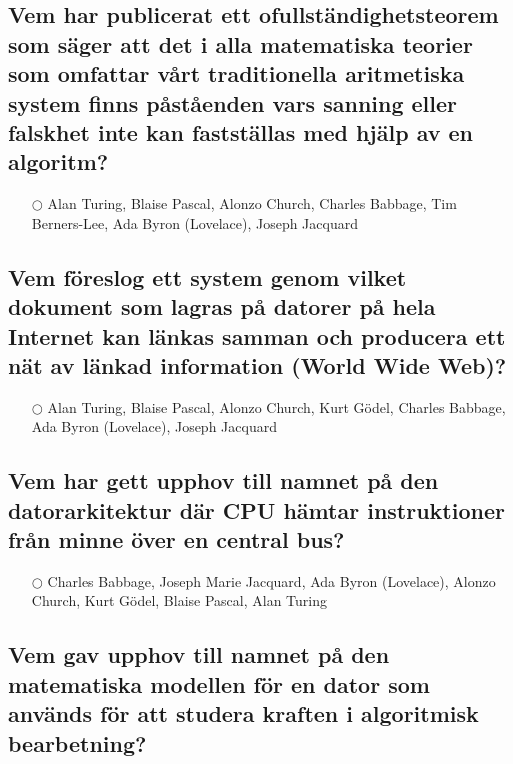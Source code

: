 \documentclass[a4paper,11pt,oneside]{article}
\begin{document}
\begin{sloppypar}
\subsection{Vem har publicerat ett ofullst\"andighetsteorem som s\"ager att det i alla matematiska teorier som omfattar v\r{a}rt traditionella aritmetiska system finns p\r{a}st\r{a}enden vars sanning eller falskhet inte kan fastst\"allas med hj\"alp av en algoritm?}

\label{q:438:mc:sv:True}

\begin{itemize}
  \item[$\bigcirc$] Alan Turing, Blaise Pascal, Alonzo Church, Charles Babbage, Tim Berners-Lee, Ada Byron (Lovelace), Joseph Jacquard
\end{itemize}



\subsection{Vem f\"oreslog ett system genom vilket dokument som lagras p\r{a} datorer p\r{a} hela Internet kan l\"ankas samman och producera ett n\"at av l\"ankad information (World Wide Web)?}

\label{q:439:mc:sv:True}

\begin{itemize}
  \item[$\bigcirc$] Alan Turing, Blaise Pascal, Alonzo Church, Kurt G\"odel, Charles Babbage, Ada Byron (Lovelace), Joseph Jacquard
\end{itemize}



\subsection{Vem har gett upphov till namnet p\r{a} den datorarkitektur d\"ar CPU h\"amtar instruktioner fr\r{a}n minne \"over en central bus?}

\label{q:440:mc:sv:True}

\begin{itemize}
  \item[$\bigcirc$] Charles Babbage, Joseph Marie Jacquard, Ada Byron (Lovelace), Alonzo Church, Kurt G\"odel, Blaise Pascal, Alan Turing
\end{itemize}



\subsection{Vem gav upphov till namnet p\r{a} den matematiska modellen f\"or en dator som anv\"ands f\"or att studera kraften i algoritmisk bearbetning?}


\end{sloppypar}
\end{document}
